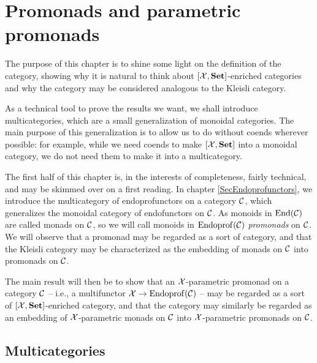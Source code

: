 \documentclass{report}[11pt]
\begin{document}
\chapter{Promonads and parametric promonads}
\label{ChapPromonads}

The purpose of this chapter is to shine some light on the definition of the \Mellies category, showing why it is natural to think about $[\mathcal X,{\normalfont\textbf{Set}}]$-enriched categories and why the \Mellies category may be considered analogous to the Kleisli category.

As a technical tool to prove the results we want, we shall introduce multicategories, which are a small generalization of monoidal categories.  
The main purpose of this generalization is to allow us to do without coends wherever possible: for example, while we need coends to make $[\mathcal X,{\normalfont\textbf{Set}}]$ into a monoidal category, we do not need them to make it into a multicategory.  

The first half of this chapter is, in the interests of completeness, fairly technical, and may be skimmed over on a first reading.  
In chapter \ref{SecEndoprofunctors}, we introduce the multicategory of endoprofunctors on a category ${\mathcal{C}}$, which generalizes the monoidal category of endofunctors on ${\mathcal{C}}$.  
As monoids in $\operatorname{End}({\mathcal{C}})$ are called monads on ${\mathcal{C}}$, so we will call monoids in $\operatorname{Endoprof}({\mathcal{C}})$ \emph{promonads} on ${\mathcal{C}}$.  
We will observe that a promonad may be regarded as a sort of category, and that the Kleisli category may be characterized as the embedding of monads on ${\mathcal{C}}$ into promonads on ${\mathcal{C}}$.  

The main result will then be to show that an $\mathcal X$-parametric promonad on a category ${\mathcal{C}}$ -- i.e., a multifunctor $\mathcal X \to \operatorname{Endoprof}({\mathcal{C}})$ -- may be regarded as a sort of $[\mathcal X,{\normalfont\textbf{Set}}]$-enriched category, and that the \Mellies category may similarly be regarded as an embedding of $\mathcal X$-parametric monads on ${\mathcal{C}}$ into $\mathcal X$-parametric promonads on ${\mathcal{C}}$.

\section{Multicategories}
\end{document}
